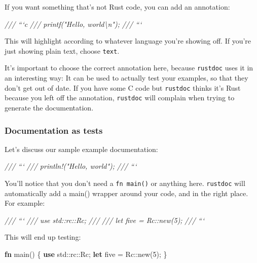 \documentclass[a4paper,]{book}
\newenvironment{Shaded}{\begin{snugshade}}{\end{snugshade}}
\newcommand{\KeywordTok}[1]{\textcolor[rgb]{0.13,0.29,0.53}{\textbf{{#1}}}}
\newcommand{\DecValTok}[1]{\textcolor[rgb]{0.00,0.00,0.81}{{#1}}}
\newcommand{\CommentTok}[1]{\textcolor[rgb]{0.56,0.35,0.01}{\textit{{#1}}}}
\newcommand{\NormalTok}[1]{{#1}}
\begin{document}
If you want something that's not Rust code, you can add an annotation:

\begin{Shaded}
\begin{Highlighting}[]
\CommentTok{/// ```c}
\CommentTok{/// printf("Hello, world\textbackslash{}n");}
\CommentTok{/// ```}
\end{Highlighting}
\end{Shaded}

This will highlight according to whatever language you're showing off.
If you're just showing plain text, choose \texttt{text}.

It's important to choose the correct annotation here, because
\texttt{rustdoc} uses it in an interesting way: It can be used to
actually test your examples, so that they don't get out of date. If you
have some C code but \texttt{rustdoc} thinks it's Rust because you left
off the annotation, \texttt{rustdoc} will complain when trying to
generate the documentation.

\subsubsection{Documentation as tests}\label{documentation-as-tests}

Let's discuss our sample example documentation:

\begin{Shaded}
\begin{Highlighting}[]
\CommentTok{/// ```}
\CommentTok{/// println!("Hello, world");}
\CommentTok{/// ```}
\end{Highlighting}
\end{Shaded}

You'll notice that you don't need a \texttt{fn\ main()} or anything
here. \texttt{rustdoc} will automatically add a main() wrapper around
your code, and in the right place. For example:

\begin{Shaded}
\begin{Highlighting}[]
\CommentTok{/// ```}
\CommentTok{/// use std::rc::Rc;}
\CommentTok{///}
\CommentTok{/// let five = Rc::new(5);}
\CommentTok{/// ```}
\end{Highlighting}
\end{Shaded}

This will end up testing:

\begin{Shaded}
\begin{Highlighting}[]
\KeywordTok{fn} \NormalTok{main() \{}
    \KeywordTok{use} \NormalTok{std::rc::Rc;}
    \KeywordTok{let} \NormalTok{five = Rc::new(}\DecValTok{5}\NormalTok{);}
\NormalTok{\}}
\end{Highlighting}
\end{Shaded}
\end{document}
